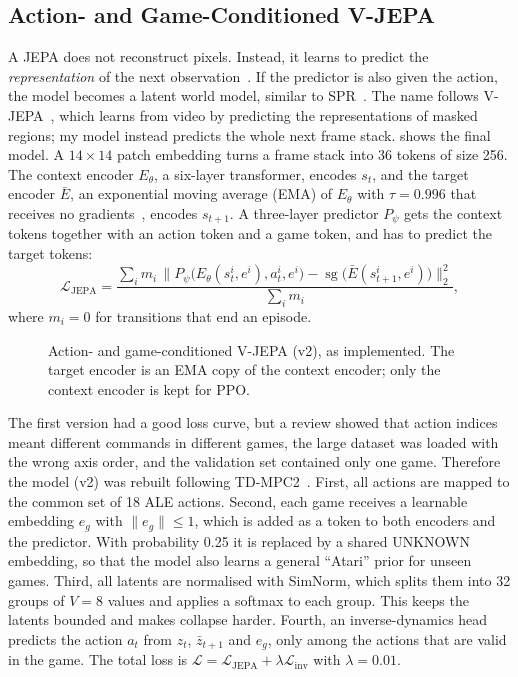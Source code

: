 \documentclass[runningheads]{llncs}
\begin{document}
\FloatBarrier
\subsection{Action- and Game-Conditioned V-JEPA}

A JEPA does not reconstruct pixels. Instead, it learns to predict the \emph{representation}
of the next observation~\cite{lecun2022path}. If the predictor is also given the action, the
model becomes a latent world model, similar to SPR~\cite{schwarzer2021spr}. The name follows
V-JEPA~\cite{bardes2024vjepa}, which learns from video by predicting the representations of
masked regions; my model instead predicts the whole next frame stack. 
shows the final model. A $14\times14$ patch embedding turns a frame stack into 36 tokens of
size 256. The context encoder $E_\theta$, a six-layer transformer, encodes $s_t$, and the
target encoder $\bar E$, an exponential moving average (EMA) of $E_\theta$ with $\tau=0.996$
that receives no gradients~\cite{assran2023ijepa}, encodes $s_{t+1}$. A three-layer predictor
$P_\psi$ gets the context tokens together with an action token and a game token, and has to
predict the target tokens:
\begin{equation}
  \mathcal{L}_{\text{JEPA}}=\frac{\sum_i m_i\,\big\|P_\psi\big(E_\theta(s_t^i,e^i),a_t^i,e^i\big)
  -\operatorname{sg}\big(\bar E(s_{t+1}^i,e^i)\big)\big\|_2^2}{\sum_i m_i},
\end{equation}
where $m_i=0$ for transitions that end an episode.

\begin{figure}[!htbp]
\centering

\caption{Action- and game-conditioned V-JEPA (v2), as implemented. The target
encoder is an EMA copy of the context encoder; only the context encoder is kept for PPO.}
\label{fig:jepa}
\end{figure}

The first version had a good loss curve, but a review showed that action indices meant
different commands in different games, the large dataset was loaded with the wrong axis order,
and the validation set contained only one game.
Therefore the model (v2) was rebuilt following TD-MPC2~\cite{hansen2024tdmpc2}. First, all actions are mapped to the common set of 18 ALE actions. Second, each game
receives a learnable embedding $e_g$ with $\|e_g\|\le1$, which is added as a token to both
encoders and the predictor. With probability 0.25 it is replaced by a shared UNKNOWN
embedding, so that the model also learns a general ``Atari'' prior for unseen games. Third, all
latents are normalised with SimNorm, which splits them into 32 groups of $V=8$ values and
applies a softmax to each group. This keeps the latents bounded and makes collapse harder. Fourth,
an inverse-dynamics head~\cite{pathak2017icm} predicts the action $a_t$ from $z_t$,
$\bar z_{t+1}$ and $e_g$, only among the actions that are valid in the game. The total loss is
$\mathcal{L}=\mathcal{L}_{\text{JEPA}}+\lambda\mathcal{L}_{\text{inv}}$ with $\lambda=0.01$.
\end{document}
